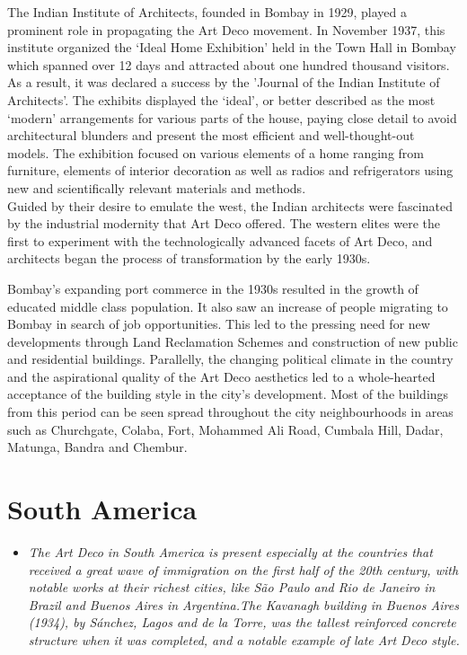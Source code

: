 The Indian Institute of Architects, founded in Bombay in 1929, played a
prominent role in propagating the Art Deco movement. In November 1937,
this institute organized the `Ideal Home Exhibition' held in the Town
Hall in Bombay which spanned over 12 days and attracted about one
hundred thousand visitors. As a result, it was declared a success by the
'Journal of the Indian Institute of Architects'. The exhibits displayed
the `ideal', or better described as the most `modern' arrangements for
various parts of the house, paying close detail to avoid architectural
blunders and present the most efficient and well-thought-out models. The
exhibition focused on various elements of a home ranging from furniture,
elements of interior decoration as well as radios and refrigerators
using new and scientifically relevant materials and methods.\\
Guided by their desire to emulate the west, the Indian architects were
fascinated by the industrial modernity that Art Deco offered. The
western elites were the first to experiment with the technologically
advanced facets of Art Deco, and architects began the process of
transformation by the early 1930s.

Bombay's expanding port commerce in the 1930s resulted in the growth of
educated middle class population. It also saw an increase of people
migrating to Bombay in search of job opportunities. This led to the
pressing need for new developments through Land Reclamation Schemes and
construction of new public and residential buildings. Parallelly, the
changing political climate in the country and the aspirational quality
of the Art Deco aesthetics led to a whole-hearted acceptance of the
building style in the city's development. Most of the buildings from
this period can be seen spread throughout the city neighbourhoods in
areas such as Churchgate, Colaba, Fort, Mohammed Ali Road, Cumbala Hill,
Dadar, Matunga, Bandra and Chembur.

\section{South America}\label{south-america}

\begin{itemize}
\item
  \emph{The Art Deco in South America is present especially at the
  countries that received a great wave of immigration on the first half
  of the 20th century, with notable works at their richest cities, like
  São Paulo and Rio de Janeiro in Brazil and Buenos Aires in
  Argentina.The Kavanagh building in Buenos Aires (1934), by Sánchez,
  Lagos and de la Torre, was the tallest reinforced concrete structure
  when it was completed, and a notable example of late Art Deco style.}
\end{itemize}

